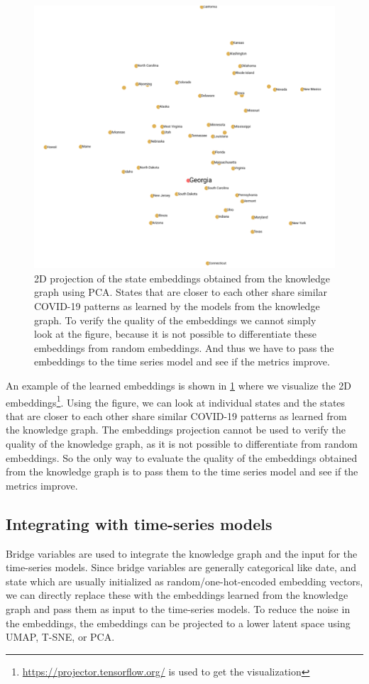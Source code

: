 \documentclass[11pt,twocolumn,letterpaper]{article}
\begin{document}
\begin{figure}
\centering
\includegraphics[width=\linewidth]{images/embeddings.png}
\caption{2D projection of the state embeddings obtained from the knowledge graph using PCA. States that are closer to each other share similar COVID-19 patterns as learned by the models from the knowledge graph. To verify the quality of the  embeddings we cannot simply look at the figure, because it is not possible to differentiate these embeddings from random embeddings. And thus we have to pass the embeddings to the time series model and see if the metrics improve.}
\label{figure4}
\end{figure}

An example of the learned embeddings is shown in \cref{figure4} where we visualize the 2D embeddings\footnote{\href{https://projector.tensorflow.org/}{https://projector.tensorflow.org/} is used to get the visualization}. Using the figure, we can look at individual states and the states that are closer to each other share similar COVID-19 patterns as learned from the knowledge graph. The embeddings projection cannot be used to verify the quality of the knowledge graph, as it is not possible to differentiate from random embeddings. So the only way to evaluate the quality of the embeddings obtained from the knowledge graph is to pass them to the time series model and see if the metrics improve.

\subsection{Integrating with time-series models}
Bridge variables are used to integrate the knowledge graph and the input for the time-series models. Since bridge variables are generally categorical like date, and state which are usually initialized as random/one-hot-encoded embedding vectors, we can directly replace these with the embeddings learned from the knowledge graph and pass them as input to the time-series models. To reduce the noise in the embeddings, the embeddings can be projected to a lower latent space using UMAP, T-SNE, or PCA.
\end{document}
